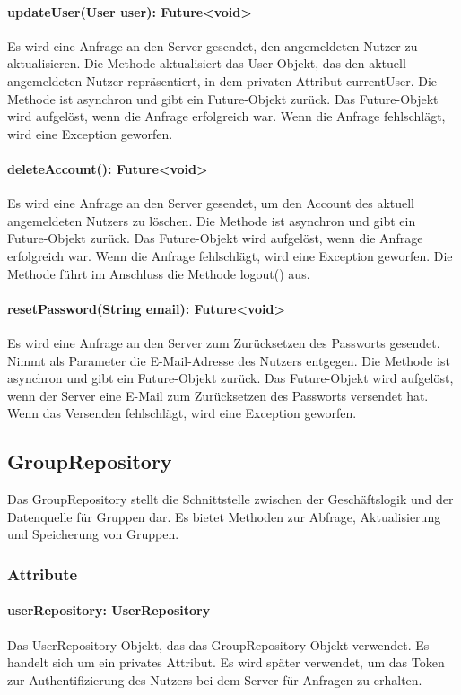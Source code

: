 \documentclass[parskip=full]{scrartcl}
\begin{document}
\paragraph{updateUser(User user): Future<void>}
Es wird eine Anfrage an den Server gesendet, den angemeldeten Nutzer zu aktualisieren. Die Methode aktualisiert das User-Objekt, das den aktuell angemeldeten Nutzer repräsentiert, in dem privaten Attribut currentUser.
Die Methode ist asynchron und gibt ein Future-Objekt zurück. Das Future-Objekt wird aufgelöst, wenn die Anfrage erfolgreich war. Wenn die Anfrage fehlschlägt, wird eine Exception geworfen.
\paragraph{deleteAccount(): Future<void>}
Es wird eine Anfrage an den Server gesendet, um den Account des aktuell angemeldeten Nutzers zu löschen. Die Methode ist asynchron und gibt ein Future-Objekt zurück. Das Future-Objekt wird aufgelöst, wenn die Anfrage erfolgreich war. Wenn die Anfrage fehlschlägt, wird eine Exception geworfen. Die Methode führt im Anschluss die Methode logout() aus.
\paragraph{resetPassword(String email): Future<void>}
Es wird eine Anfrage an den Server zum Zurücksetzen des Passworts gesendet. Nimmt als Parameter die E-Mail-Adresse des Nutzers entgegen. Die Methode ist asynchron und gibt ein Future-Objekt zurück. Das Future-Objekt wird aufgelöst, wenn der Server eine E-Mail zum Zurücksetzen des Passworts versendet hat. Wenn das Versenden fehlschlägt, wird eine Exception geworfen.

\subsection{GroupRepository}
Das GroupRepository stellt die Schnittstelle zwischen der Geschäftslogik und der Datenquelle für Gruppen dar. Es bietet Methoden zur Abfrage, Aktualisierung und Speicherung von Gruppen.
\subsubsection{Attribute}
\paragraph{userRepository: UserRepository}
Das UserRepository-Objekt, das das GroupRepository-Objekt verwendet. Es handelt sich um ein privates Attribut. Es wird später verwendet, um das Token zur Authentifizierung des Nutzers bei dem Server für Anfragen zu erhalten.
\end{document}
